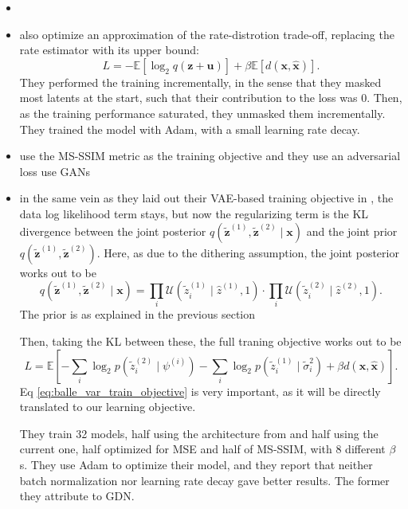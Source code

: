 \documentclass{article}
\renewcommand{\vec}[1]{\mathbf{#1}}
\newcommand{\Exp}{\mathbb{E}}
\newcommand{\Unif}[1]{\mathcal{U}\left( #1 \right)}
\begin{document}
\begin{itemize}
\item \cite{toderici2017full}
\item \cite{theis2017lossy}
  also optimize an approximation of the rate-distrotion trade-off, replacing the
  rate estimator with its upper bound:
  \[
    L = -\Exp[\log_2 q(\vec{z} + \vec{u})] + \beta \Exp[d(\vec{x}, \vec{\hat{x}})].
  \]
  They performed the training incrementally, in the sense that they masked most
  latents at the start, such that their contribution to the loss was 0. Then, as
  the training performance saturated, they unmasked them incrementally.
  They trained the model with Adam, with a small learning rate decay.
\item \cite{rippel2017real} use the MS-SSIM metric as the training objective and
  they use an adversarial \cite{goodfellow2014generative} loss use GANs 
\item \cite{balle2018variational} in the same vein as they laid out their
  VAE-based training objective in \cite{balle2016end}, the data log likelihood
  term stays, but now the regularizing term is the KL divergence between the
  joint posterior $q(\vec{\tilde{z}}^{(1)}, \vec{\tilde{z}}^{(2)} \mid \vec{x})$
  and the joint prior 
  $q(\vec{\tilde{z}}^{(1)}, \vec{\tilde{z}}^{(2)})$. Here, as due to the
  dithering assumption, the joint posterior works out to be
  \[
    q\left(\vec{\tilde{z}}^{(1)}, \vec{\tilde{z}}^{(2)} \mid \vec{x}\right) =
    \prod_i \Unif{\tilde{z}^{(1)}_i \mid \hat{z}^{(1)}, 1} \cdot
    \prod_i \Unif{\tilde{z}^{(2)}_i \mid \hat{z}^{(2)}, 1}.
  \]
  The prior is as explained in the previous section
  \par
  Then, taking the KL between these, the full traning objective works out to be
  \begin{equation}
    \label{eq:balle_var_train_objective}
    L = \Exp\left[ -\sum_i \log_2 p(\tilde{z}^{(2)}_i \mid \psi^{(i)}) 
      -\sum_i \log_2 p(\tilde{z}^{(1)}_i \mid \tilde{\sigma}^2_i) +
      \beta d(\vec{x}, \vec{\hat{x}})\right].
  \end{equation}
  Eq \ref{eq:balle_var_train_objective} is very important, as it will be
  directly translated to our learning objective.
  \par
  They train 32 models, half using the architecture from \cite{balle2016end} and
  half using the current one, half optimized for MSE and half of MS-SSIM, with 8
  different $\beta$s. They use Adam to optimize their model, and they report
  that neither batch normalization nor learning rate decay gave better results.
  The former they attribute to GDN.
\end{itemize}
\end{document}
